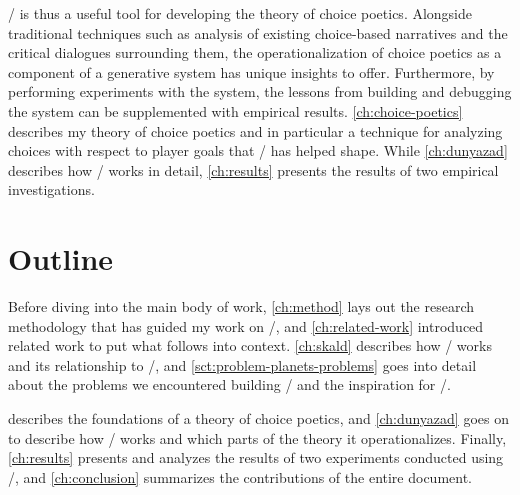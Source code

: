 \dunyazad/ is thus a useful tool for developing the theory of choice poetics.
%
Alongside traditional techniques such as analysis of existing choice-based narratives and the critical dialogues surrounding them, the operationalization of choice poetics as a component of a generative system has unique insights to offer.
%
Furthermore, by performing experiments with the system, the lessons from building and debugging the system can be supplemented with empirical results.
%
\cref{ch:choice-poetics} describes my theory of choice poetics and in particular a technique for analyzing choices with respect to player goals that \dunyazad/ has helped shape.
%
While \cref{ch:dunyazad} describes how \dunyazad/ works in detail, \cref{ch:results} presents the results of two empirical investigations.



\section{Outline}


Before diving into the main body of work, \cref{ch:method} lays out the research methodology that has guided my work on \dunyazad/, and \cref{ch:related-work} introduced related work to put what follows into context.
%
\cref{ch:skald} describes how \skald/ works and its relationship to \minstrel/, and \cref{sct:problem-planets-problems} goes into detail about the problems we encountered building \problemplanets/ and the inspiration for \dunyazad/.


 describes the foundations of a theory of choice poetics, and \cref{ch:dunyazad} goes on to describe how \dunyazad/ works and which parts of the theory it operationalizes.
%
Finally, \cref{ch:results} presents and analyzes the results of two experiments conducted using \dunyazad/, and \cref{ch:conclusion} summarizes the contributions of the entire document.

